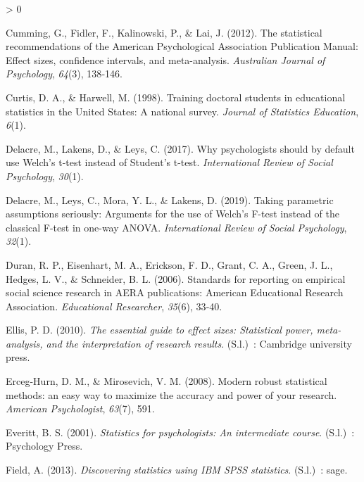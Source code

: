 \documentclass[
  12pt,
  french,
]{article}
\newlength{\cslhangindent}
\newenvironment{CSLReferences}[2] %
 {%
  \setlength{\parindent}{0pt}
  \ifodd #1 \everypar{\setlength{\hangindent}{\cslhangindent}}\ignorespaces\fi
  \ifnum #2 > 0
  \setlength{\parskip}{#2\baselineskip}
  \fi
 }%
 {}
\begin{document}
\begin{CSLReferences}{1}{0}
\leavevmode\hypertarget{ref-cumming_statistical_2012}{}%
Cumming, G., Fidler, F., Kalinowski, P., \& Lai, J. (2012). The
statistical recommendations of the American Psychological Association
Publication Manual: Effect sizes, confidence intervals, and
meta-analysis. \emph{Australian Journal of Psychology}, \emph{64}(3),
138‑146.

\leavevmode\hypertarget{ref-curtis_training_1998}{}%
Curtis, D. A., \& Harwell, M. (1998). Training doctoral students in
educational statistics in the United States: A national survey.
\emph{Journal of Statistics Education}, \emph{6}(1).

\leavevmode\hypertarget{ref-delacre_why_2017}{}%
Delacre, M., Lakens, D., \& Leys, C. (2017). Why psychologists should by
default use Welch's t-test instead of Student's t-test.
\emph{International Review of Social Psychology}, \emph{30}(1).

\leavevmode\hypertarget{ref-delacre_taking_2019}{}%
Delacre, M., Leys, C., Mora, Y. L., \& Lakens, D. (2019). Taking
parametric assumptions seriously: Arguments for the use of Welch's
F-test instead of the classical F-test in one-way {ANOVA}.
\emph{International Review of Social Psychology}, \emph{32}(1).

\leavevmode\hypertarget{ref-duran_standards_2006}{}%
Duran, R. P., Eisenhart, M. A., Erickson, F. D., Grant, C. A., Green, J.
L., Hedges, L. V., \& Schneider, B. L. (2006). Standards for reporting
on empirical social science research in {AERA} publications: American
Educational Research Association. \emph{Educational Researcher},
\emph{35}(6), 33‑40.

\leavevmode\hypertarget{ref-ellis_essential_2010}{}%
Ellis, P. D. (2010). \emph{The essential guide to effect sizes:
Statistical power, meta-analysis, and the interpretation of research
results}. (S.l.)~: Cambridge university press.

\leavevmode\hypertarget{ref-erceg-hurn_modern_2008}{}%
Erceg-Hurn, D. M., \& Mirosevich, V. M. (2008). Modern robust
statistical methods: an easy way to maximize the accuracy and power of
your research. \emph{American Psychologist}, \emph{63}(7), 591.

\leavevmode\hypertarget{ref-everitt_statistics_2001}{}%
Everitt, B. S. (2001). \emph{Statistics for psychologists: An
intermediate course}. (S.l.)~: Psychology Press.

\leavevmode\hypertarget{ref-field_discovering_2013}{}%
Field, A. (2013). \emph{Discovering statistics using {IBM} {SPSS}
statistics}. (S.l.)~: sage.


\end{CSLReferences}
\end{document}
